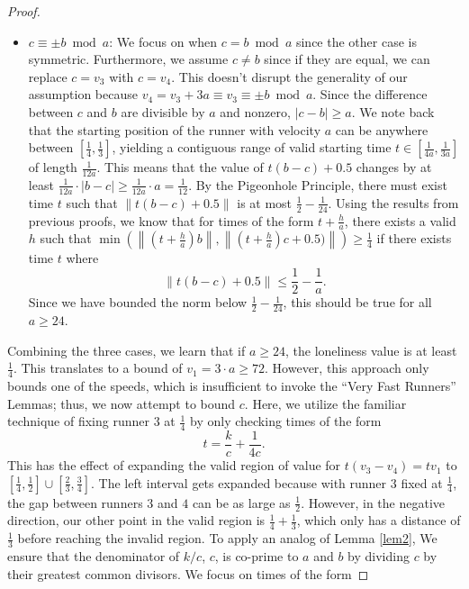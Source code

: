 \documentclass[11pt]{amsart}
\newcommand{\norm}[1]{\lVert #1 \rVert}
\newcommand{\Norm}[1]{\left\lVert #1 \right\rVert}
\begin{document}
\begin{proof}
\begin{itemize}
        \item [--] $c \equiv \pm b \bmod a$: We focus on when $c = b \bmod a$ since the other case is symmetric. Furthermore, we assume $c \neq b$ since if they are equal, we can replace $c = v_3$ with $c = v_4$. This doesn't disrupt the generality of our assumption because $v_4 = v_3 + 3a \equiv v_3 \equiv \pm b \bmod a$. Since the difference between $c$ and $b$ are divisible by $a$ and nonzero, $|c - b| \geq a$. We note back that the starting position of the runner with velocity $a$ can be anywhere between $[\frac{1}{4},\frac{1}{3}]$, yielding a contiguous range of valid starting time $t \in [\frac{1}{4a},\frac{1}{3a}]$ of length $\frac{1}{12a}$. This means that the value of $t(b - c) + 0.5$ changes by at least $\frac{1}{12a} \cdot |b - c| \geq \frac{1}{12a} \cdot a = \frac{1}{12}$. By the Pigeonhole Principle, there must exist time $t$ such that $\norm{t(b - c) + 0.5}$ is at most $\frac{1}{2} - \frac{1}{24}$. Using the results from previous proofs, we know that for times of the form $t + \frac{h}{a}$, there  exists a valid $h$ such that $\min(\Norm{(t + \frac{h}{a})b},\Norm{(t + \frac{h}{a})c + 0.5)}) \geq \frac{1}{4}$ if there exists time $t$ where
        $$\norm{t(b - c) + 0.5} \leq \frac{1}{2} - \frac{1}{a}.$$
        Since we have bounded the norm below $\frac{1}{2} - \frac{1}{24}$, this should be true for all $a \geq 24$.
    \end{itemize}
    Combining the three cases, we learn that if $a \geq 24$, the loneliness value is at least $\frac{1}{4}$. This translates to a bound of $v_1 = 3 \cdot a \geq 72$. However, this approach only bounds one of the speeds, which is insufficient to invoke the ``Very Fast Runners'' Lemmas; thus, we now attempt to bound $c$. Here, we utilize the familiar technique of fixing runner $3$ at $\frac{1}{4}$ by only checking times of the form
    $$t = \frac{k}{c} + \frac{1}{4c}.$$
    This has the effect of expanding the valid region of value for $t(v_3 - v_4) = tv_1$ to $[\frac{1}{4},\frac{1}{2}] \cup [\frac{2}{3},\frac{3}{4}]$. The left interval gets expanded because with runner $3$ fixed at $\frac{1}{4}$, the gap between runners $3$ and $4$ can be as large as $\frac{1}{2}$. However, in the negative direction, our other point in the valid region is $\frac{1}{4} + \frac{1}{3}$, which only has a distance of $\frac{1}{3}$ before reaching the invalid region. To apply an analog of Lemma \ref{lem2}, We ensure that the denominator of $k / c$, $c$, is co-prime to $a$ and $b$ by dividing $c$ by their greatest common divisors. We focus on times of the form

\end{proof}
\end{document}
